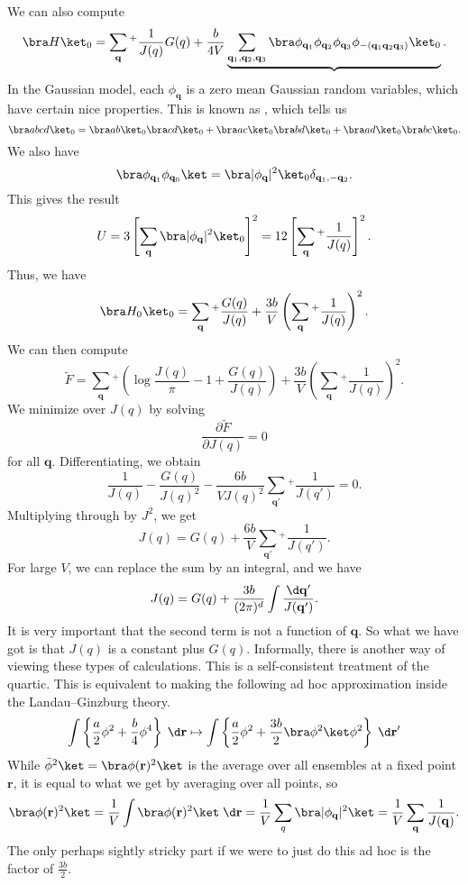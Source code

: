 \documentclass[a4paper]{article}
\begin{document}
We can also compute
\[
  \bra H\ket_0 = \sum_\mathbf{q} {}^+ \frac{1}{J(q)} G(q) + \frac{b}{4V} \underbrace{\sum_{\mathbf{q}_1, \mathbf{q}_2, \mathbf{q}_3}\bra \phi_{\mathbf{q}_1} \phi_{\mathbf{q}_2} \phi_{\mathbf{q}_3} \phi_{-(\mathbf{q}_1 \mathbf{q}_2 \mathbf{q}_3)}\ket_0}.
\]
In the Gaussian model, each $\phi_\mathbf{q}$ is a zero mean Gaussian random variables, which have certain nice properties. This is known as , which tells us
\[
  \bra abcd \ket_0 = \bra ab\ket_0 \bra cd\ket_0 + \bra ac\ket_0 \bra bd\ket_0 + \bra ad\ket_0 \bra bc\ket_0.
\]
We also have
\[
  \bra \phi_{\mathbf{q}_1} \phi_{\mathbf{q}_0}\ket = \bra |\phi_\mathbf{q}|^2 \ket_0 \delta_{\mathbf{q}_1, - \mathbf{q}_2}.
\]
This gives the result
\[
  U = 3 \left[\sum_\mathbf{q} \bra |\phi_\mathbf{q}|^2\ket_0\right]^2 = 12 \left[\sum_\mathbf{q} {}^+ \frac{1}{J(q)}\right]^2.
\]
Thus, we have
\[
  \bra H_0\ket_0 = \sum_{\mathbf{q}} {}^+ \frac{G(q)}{J(q)} + \frac{3b}{V} \left(\sum_\mathbf{q} {}^+ \frac{1}{J(q)}\right)^2.
\]
We can then compute
\[
  \tilde{F} = \sum_{\mathbf{q}} {}^+ \left(\log \frac{J(q)}{\pi} - 1 + \frac{G(q)}{J(q)}\right) + \frac{3b}{V}\left(\sum_\mathbf{q} {}^+ \frac{1}{J(q)}\right)^2.
\]
We minimize over $J(q)$ by solving
\[
  \frac{\partial \tilde{F}}{\partial J(q)} = 0
\]
for all $\mathbf{q}$. Differentiating, we obtain
\[
  \frac{1}{J(q)} - \frac{G(q)}{J(q)^2} - \frac{6b}{V J(q)^2} \sum_{\mathbf{q}'} {}^+ \frac{1}{J(q')} = 0.
\]
Multiplying through by $J^2$, we get
\[
  J(q) = G(q) + \frac{6b}{V} \sum_{\mathbf{q}'} {}^+ \frac{1}{J(q')}.
\]
For large $V$, we can replace the sum by an integral, and we have
\[
  J(q) = G(q) + \frac{3b}{(2\pi)^d} \int \frac{\d \mathbf{q}'}{J(\mathbf{q}')}.
\]
It is very important that the second term is not a function of $\mathbf{q}$. So what we have got is that $J(q)$ is a constant plus $G(q)$. Informally, there is another way of viewing these types of calculations. This is a self-consistent treatment of the quartic. This is equivalent to making the following ad hoc approximation inside the Landau--Ginzburg theory.
\[
  \int \left\{ \frac{a}{2} \phi^2 + \frac{b}{4} \phi^4\right\} \;\d \mathbf{r} \mapsto  \int \left\{ \frac{a}{2} \phi^2 + \frac{3b}{2} \bra \phi^2 \ket \phi^2\right\}\;\d \mathbf{r}'
\]
While $\bar \phi^2\ket = \bra \phi(\mathbf{r})^2\ket$ is the average over all ensembles at a fixed point $\mathbf{r}$, it is equal to what we get by averaging over all points, so
\[
  \bra \phi(\mathbf{r})^2\ket = \frac{1}{V} \int \bra \phi(\mathbf{r})^2\ket \;\d \mathbf{r} = \frac{1}{V} \sum_q \bra |\phi_\mathbf{q}|^2 \ket = \frac{1}{V} \sum_{\mathbf{q}} \frac{1}{J(\mathbf{q})}.
\]
The only perhaps sightly stricky part if we were to just do this ad hoc is the factor of $\frac{3b}{2}$.
\end{document}
